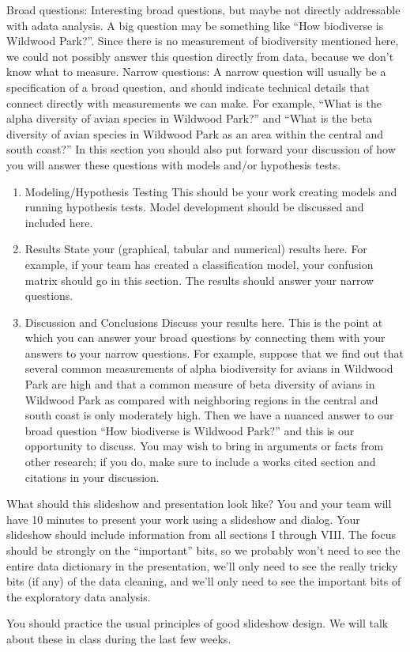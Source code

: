 \documentclass[]{article}
\begin{document}
Broad questions: Interesting broad questions, but maybe not directly
addressable with adata analysis. A big question may be something like
``How biodiverse is Wildwood Park?''. Since there is no measurement of
biodiversity mentioned here, we could not possibly answer this question
directly from data, because we don't know what to measure. Narrow
questions: A narrow question will usually be a specification of a broad
question, and should indicate technical details that connect directly
with measurements we can make. For example, ``What is the alpha
diversity of avian species in Wildwood Park?'' and ``What is the beta
diversity of avian species in Wildwood Park as an area within the
central and south coast?'' In this section you should also put forward
your discussion of how you will answer these questions with models
and/or hypothesis tests.

\begin{enumerate}
\def\labelenumi{\Roman{enumi}.}
\setcounter{enumi}{5}
\item
  Modeling/Hypothesis Testing This should be your work creating models
  and running hypothesis tests. Model development should be discussed
  and included here.
\item
  Results State your (graphical, tabular and numerical) results here.
  For example, if your team has created a classification model, your
  confusion matrix should go in this section. The results should answer
  your narrow questions.
\item
  Discussion and Conclusions Discuss your results here. This is the
  point at which you can answer your broad questions by connecting them
  with your answers to your narrow questions. For example, suppose that
  we find out that several common measurements of alpha biodiversity for
  avians in Wildwood Park are high and that a common measure of beta
  diversity of avians in Wildwood Park as compared with neighboring
  regions in the central and south coast is only moderately high. Then
  we have a nuanced answer to our broad question ``How biodiverse is
  Wildwood Park?'' and this is our opportunity to discuss. You may wish
  to bring in arguments or facts from other research; if you do, make
  sure to include a works cited section and citations in your
  discussion.
\end{enumerate}

What should this slideshow and presentation look like? You and your team
will have 10 minutes to present your work using a slideshow and dialog.
Your slideshow should include information from all sections I through
VIII. The focus should be strongly on the ``important'' bits, so we
probably won't need to see the entire data dictionary in the
presentation, we'll only need to see the really tricky bits (if any) of
the data cleaning, and we'll only need to see the important bits of the
exploratory data analysis.

You should practice the usual principles of good slideshow design. We
will talk about these in class during the last few weeks.
\end{document}
